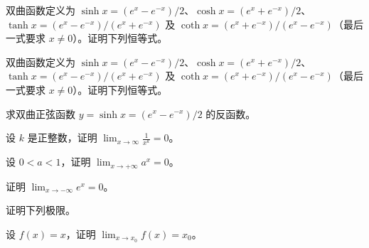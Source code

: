 \noindent\begin{minipage}{\textwidth}
双曲函数定义为 $\sinh x=(e^x-e^{-x})/2$、$\cosh x=(e^x+e^{-x})/2$、$\tanh x=(e^x-e^{-x})/(e^x+e^{-x})$ 及 $\coth x=(e^x+e^{-x})/(e^x-e^{-x})$（最后一式要求 $x\ne0$）。证明下列恒等式。
\end{minipage}\par\vfill
\noindent\begin{minipage}{\textwidth}
双曲函数定义为 $\sinh x=(e^x-e^{-x})/2$、$\cosh x=(e^x+e^{-x})/2$、$\tanh x=(e^x-e^{-x})/(e^x+e^{-x})$ 及 $\coth x=(e^x+e^{-x})/(e^x-e^{-x})$（最后一式要求 $x\ne0$）。证明下列恒等式。
\end{minipage}\par\vfill
\noindent\begin{minipage}{\textwidth}
求双曲正弦函数 $y=\sinh x=(e^x-e^{-x})/2$ 的反函数。
\end{minipage}\par\vfill
\newpage
\noindent\begin{minipage}{\textwidth}
设 $k$ 是正整数，证明 $\displaystyle\lim_{x\to\infty}\frac1{x^k}=0$。
\end{minipage}\par\vfill
\noindent\begin{minipage}{\textwidth}
设 $0<a<1$，证明 $\displaystyle\lim_{x\to+\infty}a^x=0$。
\end{minipage}\par\vfill
\noindent\begin{minipage}{\textwidth}
证明 $\displaystyle\lim_{x\to-\infty}e^x=0$。
\end{minipage}\par\vfill
\noindent\begin{minipage}{\textwidth}
证明下列极限。
\end{minipage}\par\vfill
\newpage
\noindent\begin{minipage}{\textwidth}
设 $f(x)=x$，证明 $\displaystyle\lim_{x\to x_0}f(x)=x_0$。
\end{minipage}\par\vfill
